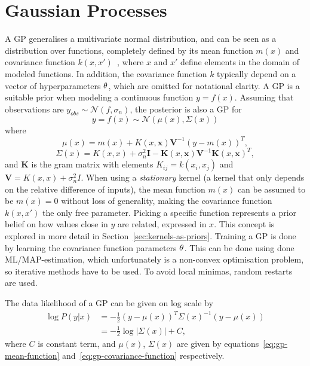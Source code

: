 \section{Gaussian Processes}
A GP generalises a multivariate normal distribution, and can be seen
as a distribution over functions, completely defined by its
mean function $m(x)$ and covariance function $k(x, x')$~\cite{Rasmussen-Williams-2006}, 
where $x$ and $x'$ define elements
in the domain of modeled functions. In addition, the covariance function $k$ typically
depend on a vector of hyperparameters $\theta$, which are
omitted for notational clarity. A GP is a suitable prior when modeling
a continuous function $y = f(x)$. Assuming that observations are $y_{obs} \sim \mathcal{N}(f,\sigma_n)$, 
the posterior is also a GP for
\begin{equation}
  \label{eq:gp}
  y = f(x) \sim \mathcal{N}(\mu(x), \Sigma(x))
\end{equation}
where
\begin{equation}
  \label{eq:gp-mean-function}
  \mu(x) = m(x) + K(x, \textbf{x})\textbf{V}^{-1}{(y-m(x))}^{T},
\end{equation}
\begin{equation}
  \label{eq:gp-covariance-function}
  \Sigma(x) = K(x, x) + \sigma^{2}_n\textbf{I} - \textbf{K}(x, \textbf{x})\textbf{V}^{-1}{\textbf{K}(x, \textbf{x})}^{T},
\end{equation}
and $\textbf{K}$ is the gram matrix with elements $K_{ij} = k(x_i, x_j)$ 
and $\textbf{V} = K(x, x) + \sigma_n^2I$.
When using a \textit{stationary} kernel (a kernel that only depends on the
relative difference of inputs), the mean function $m(x)$ can be assumed to be $m(x) = 0$
without loss of generality, making the covariance function $k(x, x')$
the only free parameter. Picking a specific function represents a prior
belief on how values close in $y$ are related, expressed in $x$. This
concept is explored in more detail in Section~\ref{sec:kernels-as-priors}.
Training a GP is done by learning the covariance function parameters $\theta$.
This can be done using done ML/MAP-estimation, which unfortunately is a non-convex
optimisation problem, so iterative methods have to be used. To avoid
local minimas, random restarts are used.

The data likelihood of a GP can be given on log scale by
\begin{equation}
  \label{eq:gp-log-likelihood}
  \begin{split}
    \log P(y|x) & = -\frac{1}{2}{(y - \mu(x))}^{T}{\Sigma(x)}^{-1}(y - \mu(x)) \\
    & = -\frac{1}{2}\log{|\Sigma(x)|}+C,
  \end{split}
\end{equation}
where $C$ is constant term, and $\mu(x)$, $\Sigma(x)$ are given by
equations~\ref{eq:gp-mean-function} and~\ref{eq:gp-covariance-function} 
respectively.

